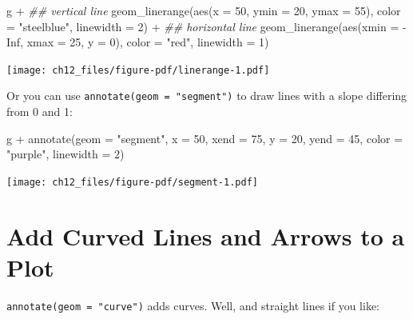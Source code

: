 \documentclass[
  letterpaper,
]{scrbook}
\newenvironment{Shaded}{\begin{snugshade}}{\end{snugshade}}
\newcommand{\AttributeTok}[1]{\textcolor[rgb]{0.40,0.45,0.13}{#1}}
\newcommand{\ConstantTok}[1]{\textcolor[rgb]{0.56,0.35,0.01}{#1}}
\newcommand{\DecValTok}[1]{\textcolor[rgb]{0.68,0.00,0.00}{#1}}
\newcommand{\DocumentationTok}[1]{\textcolor[rgb]{0.37,0.37,0.37}{\textit{#1}}}
\newcommand{\FunctionTok}[1]{\textcolor[rgb]{0.28,0.35,0.67}{#1}}
\newcommand{\NormalTok}[1]{\textcolor[rgb]{0.00,0.23,0.31}{#1}}
\newcommand{\SpecialCharTok}[1]{\textcolor[rgb]{0.37,0.37,0.37}{#1}}
\newcommand{\StringTok}[1]{\textcolor[rgb]{0.13,0.47,0.30}{#1}}
\begin{document}
\begin{Shaded}
\begin{Highlighting}[]
\NormalTok{g }\SpecialCharTok{+}
  \DocumentationTok{\#\# vertical line}
  \FunctionTok{geom\_linerange}\NormalTok{(}\FunctionTok{aes}\NormalTok{(}\AttributeTok{x =} \DecValTok{50}\NormalTok{, }\AttributeTok{ymin =} \DecValTok{20}\NormalTok{, }\AttributeTok{ymax =} \DecValTok{55}\NormalTok{),}
                 \AttributeTok{color =} \StringTok{"steelblue"}\NormalTok{, }\AttributeTok{linewidth =} \DecValTok{2}\NormalTok{) }\SpecialCharTok{+}
  \DocumentationTok{\#\# horizontal line}
  \FunctionTok{geom\_linerange}\NormalTok{(}\FunctionTok{aes}\NormalTok{(}\AttributeTok{xmin =} \SpecialCharTok{{-}}\ConstantTok{Inf}\NormalTok{, }\AttributeTok{xmax =} \DecValTok{25}\NormalTok{, }\AttributeTok{y =} \DecValTok{0}\NormalTok{),}
                 \AttributeTok{color =} \StringTok{"red"}\NormalTok{, }\AttributeTok{linewidth =} \DecValTok{1}\NormalTok{)}
\end{Highlighting}
\end{Shaded}

\texttt{[image: ch12\_files/figure-pdf/linerange-1.pdf]}

Or you can use \texttt{annotate(geom\ =\ "segment")} to draw lines with
a slope differing from 0 and 1:

\begin{Shaded}
\begin{Highlighting}[]
\NormalTok{g }\SpecialCharTok{+}
  \FunctionTok{annotate}\NormalTok{(}\AttributeTok{geom =} \StringTok{"segment"}\NormalTok{, }
           \AttributeTok{x =} \DecValTok{50}\NormalTok{, }\AttributeTok{xend =} \DecValTok{75}\NormalTok{,}
                   \AttributeTok{y =} \DecValTok{20}\NormalTok{, }\AttributeTok{yend =} \DecValTok{45}\NormalTok{,}
               \AttributeTok{color =} \StringTok{"purple"}\NormalTok{, }\AttributeTok{linewidth =} \DecValTok{2}\NormalTok{)}
\end{Highlighting}
\end{Shaded}

\texttt{[image: ch12\_files/figure-pdf/segment-1.pdf]}

\section{Add Curved Lines and Arrows to a
Plot}\label{add-curved-lines-and-arrows-to-a-plot}

\texttt{annotate(geom\ =\ "curve")} adds curves. Well, and straight
lines if you like:
\end{document}
